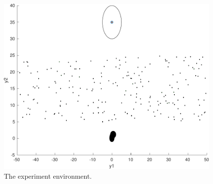 \begin{figure}[!t]
  \centering
  \includegraphics[width=.8\columnwidth]{figures/experiments/simulated-forest}
  \caption{The experiment environment.}
  \label{fig:simulated-forest}
\end{figure}

